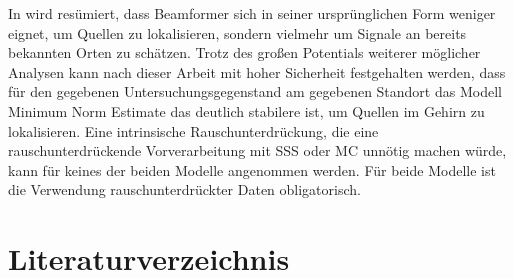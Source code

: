 \documentclass[doc,a4paper,12pt]{apa6}
\begin{document}
In \textcite{hansen2010meg} wird resümiert, dass Beamformer sich in seiner ursprünglichen Form weniger eignet, um Quellen zu lokalisieren, sondern vielmehr um Signale an bereits bekannten Orten zu schätzen. Trotz des großen Potentials weiterer möglicher Analysen kann nach dieser Arbeit mit hoher Sicherheit festgehalten werden, dass für den gegebenen Untersuchungsgegenstand am gegebenen Standort das Modell Minimum Norm Estimate das deutlich stabilere ist, um Quellen im Gehirn zu lokalisieren. Eine intrinsische Rauschunterdrückung, die eine rauschunterdrückende Vorverarbeitung mit SSS oder MC unnötig machen würde, kann für keines der beiden Modelle angenommen werden. Für beide Modelle ist die Verwendung rauschunterdrückter Daten obligatorisch.

\newpage
\section{Literaturverzeichnis}

\printbibliography[heading=none]

%
\end{document}
